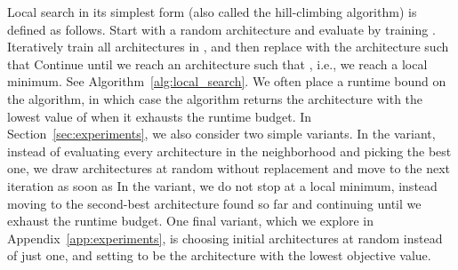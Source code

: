 \documentclass[11pt]{article}
\numberwithin{equation}{section}
\numberwithin{figure}{section}
\theoremstyle{plain}
\theoremstyle{definition}
\begin{document}
Local search in its simplest form (also called the hill-climbing algorithm) 
is defined as follows. 
Start with a random architecture  and evaluate  by training .
Iteratively train all architectures in , and then replace  with the architecture  
such that 
Continue until we reach an architecture 
such that , i.e., we reach a local minimum.
See Algorithm~\ref{alg:local_search}.
We often place a runtime bound on the algorithm, in which case the algorithm returns the
architecture  with the lowest value of  when it exhausts the runtime budget.
In Section~\ref{sec:experiments}, 
we also consider two simple variants.
In the  variant, instead of evaluating every architecture 
in the neighborhood  and picking the best one, 
we draw architectures  at random without replacement
and move to the next iteration as soon as 
In the  variant, we do not stop at a local minimum, instead
moving to the second-best architecture found so far and continuing until we exhaust
the runtime budget.
One final variant, which we explore in Appendix~\ref{app:experiments},
is choosing  initial architectures at random instead of just one,
and setting  to be the architecture with the lowest objective value.

\begin{comment} Local search will only stop when it reaches a \emph{local minimum}: an architecture 
with the lowest objective value among all architectures in its neighborhood.
Note that the \emph{global minimum}, , 
is also a local minimum.
In many applications, we place a runtime bound on the algorithm.
Then the algorithm returns the architecture  with the lowest value of  
that it has trained so far when it reaches the runtime bound.
In Section~\ref{sec:experiments}, we consider two simple variants 
of Algorithm~\ref{alg:local_search}.
First, instead of evaluating every architecture in the set  
and choosing  as the best one,
we draw architectures  from  randomly without replacement,
and we choose  as the first architecture  we find such that .
We call this the  variant.
In the second variant of local search,
we do not stop once we reach a local minimum, 
instead moving to the second-best architecture we have evaluated so far, 
and evaluating its neighborhood.
We call this the  variant.
One final variant, which we explore in Appendix~\ref{app:experiments},
is choosing  initial architectures at random instead of just one
and setting  as the random architecture with the lowest objective value.
\end{comment}
\end{document}
